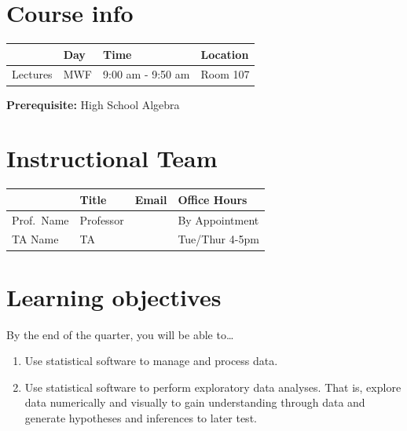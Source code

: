 \documentclass[
  letterpaper,
  DIV=11,
  numbers=noendperiod]{scrreprt}
\providecommand{\tightlist}{%
  \setlength{\itemsep}{0pt}\setlength{\parskip}{0pt}}\usepackage{longtable,booktabs,array}
\begin{document}

\hypertarget{course-info}{%
\section*{Course info}\label{course-info}}


\begin{longtable}[]{@{}llll@{}}
\toprule\noalign{}
& Day & Time & Location \\
\midrule\noalign{}
\endhead
\bottomrule\noalign{}
\endlastfoot
Lectures & MWF & 9:00 am - 9:50 am & Room 107 \\
\end{longtable}

\textbf{Prerequisite:} High School Algebra

\hypertarget{instructional-team}{%
\section*{Instructional Team}\label{instructional-team}}


\begin{longtable}[]{@{}llll@{}}
\toprule\noalign{}
& Title & Email & Office Hours \\
\midrule\noalign{}
\endhead
\bottomrule\noalign{}
\endlastfoot
Prof.~Name & Professor & & By Appointment \\
TA Name & TA & & Tue/Thur 4-5pm \\
\end{longtable}

\hypertarget{learning-objectives}{%
\section*{Learning objectives}\label{learning-objectives}}


By the end of the quarter, you will be able to\ldots{}

\begin{enumerate}
\def\labelenumi{\arabic{enumi}.}
\tightlist
\item
  Use statistical software to manage and process data.
\item
  Use statistical software to perform exploratory data analyses. That
  is, explore data numerically and visually to gain understanding
  through data and generate hypotheses and inferences to later test.
\end{enumerate}
\end{document}
